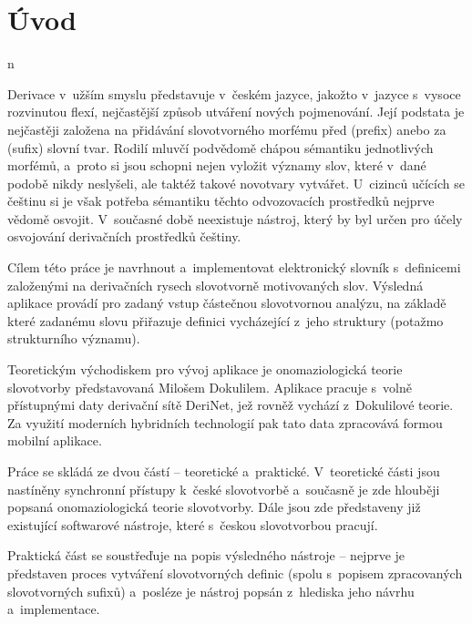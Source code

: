 \hypertarget{uxfavod}{%
\chapter*{Úvod}\label{uvod}n}

Derivace v~užším smyslu představuje v~českém jazyce, jakožto v~jazyce
s~vysoce rozvinutou flexí, nejčastější způsob utváření nových pojmenování.
Její podstata je nejčastěji založena na přidávání slovotvorného morfému
před (prefix) anebo za (sufix) slovní tvar. Rodilí mluvčí podvědomě
chápou sémantiku jednotlivých morfémů, a~proto si jsou schopni nejen
vyložit významy slov, které v~dané podobě nikdy neslyšeli, ale taktéž
takové novotvary vytvářet. U~cizinců učících se češtinu si je však
potřeba sémantiku těchto odvozovacích prostředků nejprve vědomě osvojit.
V~současné době neexistuje nástroj, který by byl určen pro účely
osvojování derivačních prostředků češtiny.

Cílem této práce je navrhnout a~implementovat elektronický slovník
s~definicemi založenými na derivačních rysech slovotvorně motivovaných
slov. Výsledná aplikace provádí pro zadaný vstup částečnou slovotvornou
analýzu, na základě které zadanému slovu přiřazuje definici vycházející
z~jeho struktury (potažmo strukturního významu).

Teoretickým východiskem pro vývoj aplikace je onomaziologická teorie
slovotvorby představovaná Milošem Dokulilem. Aplikace pracuje s~volně
přístupnými daty derivační sítě DeriNet, jež rovněž vychází z~Dokulilové
teorie. Za využití moderních hybridních technologií pak tato data
zpracovává formou mobilní aplikace.

Práce se skládá ze dvou částí -- teoretické a~praktické. V~teoretické
části jsou nastíněny synchronní přístupy k~české slovotvorbě a~současně
je zde hlouběji popsaná onomaziologická teorie slovotvorby. Dále jsou
zde představeny již existující softwarové nástroje, které s~českou
slovotvorbou pracují.

Praktická část se soustřeďuje na popis výsledného nástroje -- nejprve je
představen proces vytváření slovotvorných definic (spolu s~popisem
zpracovaných slovotvorných sufixů) a~posléze je nástroj popsán
z~hlediska jeho návrhu a~implementace.
